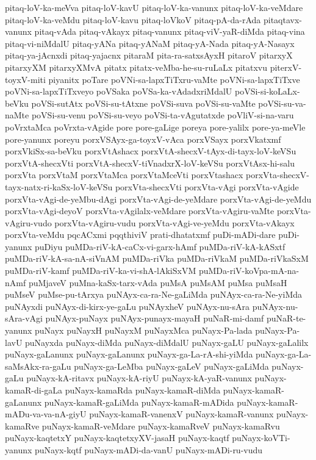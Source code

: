 {pitaq-loV-ka-meVva
pitaq-loV-kavU
pitaq-loV-ka-vanunx
pitaq-loV-ka-veMdare
pitaq-loV-ka-veMdu
pitaq-loV-kavu
pitaq-loVkoV
pitaq-pA-da-rAda
pitaqtavx-vanunx
pitaq-vAda
pitaq-vAkayx
pitaq-vanunx
pitaq-viV-yaR-diMda
pitaq-vina
pitaq-vi-niMdalU
pitaq-yANa
pitaq-yANaM
pitaq-yA-Nada
pitaq-yA-Nasayx
pitaq-ya-jAcnxdi
pitaq-yajacnx
pitaraM
pita-ra-satxsAyxH
pitaroV
pitarxyX
pitarxyXM
pitarxyXMvA
pitatx
pitatx-veMba-he-su-ruLaLx
pitatxvu
piterxV-toyxV-miti
piyanitx
poTare
poVNi-sa-lapxTiTxru-vaMte
poVNi-sa-lapxTiTxve
poVNi-sa-lapxTiTxveyo
poVSaka
poVSa-ka-vAdadxriMdalU
poVSi-si-koLaLx-beVku
poVSi-sutAtx
poVSi-su-tAtxne
poVSi-suva
poVSi-su-vaMte
poVSi-su-va-naMte
poVSi-su-venu
poVSi-su-veyo
poVSi-ta-vAgutatxde
poVliV-si-na-varu
poVrxtaMca
poVrxta-vAgide
pore
pore-gaLige
poreya
pore-yalilx
pore-ya-meVle
pore-yanunx
poreyu
porxVSAyx-ga-toyxV-vAca
porxVSayx
porxVkatxmf
porxVkiSx-sa-beVku
porxVtAshacx
porxVtA-shecxV-tAyx-di-tayx-loV-keVSu
porxVtA-shecxVti
porxVtA-shecxV-tiVnadxrX-loV-keVSu
porxVtAsx-hi-salu
porxVta
porxVtaM
porxVtaMca
porxVtaMceVti
porxVtashacx
porxVta-shecxV-tayx-natx-ri-kaSx-loV-keVSu
porxVta-shecxVti
porxVta-vAgi
porxVta-vAgide
porxVta-vAgi-de-yeMbu-dAgi
porxVta-vAgi-de-yeMdare
porxVta-vAgi-de-yeMdu
porxVta-vAgi-deyoV
porxVta-vAgilalx-veMdare
porxVta-vAgiru-vaMte
porxVta-vAgiru-vudo
porxVta-vAgiru-vudu
porxVta-vAgi-ve-yeMdu
porxVta-vAkayx
porxVta-veMdu
pqcACxmi
pqqthiviV
prati-dhatatxmf
puDi-mADi-dare
puDi-yanunx
puDiyu
puMDa-riV-kA-caCx-vi-garx-hAmf
puMDa-riV-kA-kASxtf
puMDa-riV-kA-sa-nA-siVnAM
puMDa-riVka
puMDa-riVkaM
puMDa-riVkaSxM
puMDa-riV-kamf
puMDa-riV-ka-vi-shA-lAkiSxVM
puMDa-riV-koVpa-mA-na-nAmf
puMjaveV
puMna-kaSx-tarx-vAda
puMsA
puMsAM
puMsa
puMsaH
puMseV
puMse-pu-tArxya
puNAyx-ca-ra-Ne-gaLiMda
puNAyx-ca-ra-Ne-yiMda
puNAyxdi
puNAyx-di-kirx-ye-gaLu
puNAyxheV
puNAyx-nu-sAra
puNAyx-nu-sAra-vAgi
puNAyx-puNayx
puNAyx-punayx-mayaH
puNaR-mi-damf
puNaR-te-yanunx
puNayx
puNayxH
puNayxM
puNayxMca
puNayx-Pa-lada
puNayx-Pa-lavU
puNayxda
puNayx-diMda
puNayx-diMdalU
puNayx-gaLU
puNayx-gaLalilx
puNayx-gaLanunx
puNayx-gaLanunx
puNayx-ga-La-rA-shi-yiMda
puNayx-ga-La-saMsAkx-ra-gaLu
puNayx-ga-LeMba
puNayx-gaLeV
puNayx-gaLiMda
puNayx-gaLu
puNayx-kA-ritavx
puNayx-kA-riyU
puNayx-kA-yaR-vanunx
puNayx-kamaR-di-gaLa
puNayx-kamaRda
puNayx-kamaR-diMda
puNayx-kamaR-gaLanunx
puNayx-kamaR-gaLiMda
puNayx-kamaR-mADida
puNayx-kamaR-mADu-va-va-nA-giyU
puNayx-kamaR-vanenxV
puNayx-kamaR-vanunx
puNayx-kamaRve
puNayx-kamaR-veMdare
puNayx-kamaRveV
puNayx-kamaRvu
puNayx-kaqtetxY
puNayx-kaqtetxyXV-jasaH
puNayx-kaqtf
puNayx-koVTi-yanunx
puNayx-kqtf
puNayx-mADi-da-vanU
puNayx-mADi-ru-vudu
}
